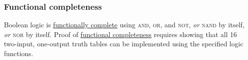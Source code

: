 \documentclass[11pt]{article}%
\begin{document}
\begin{multicols}{2}

\subsubsection{Functional completeness}
\label{Completeness}

Boolean logic is \href{https://www.geeksforgeeks.org/digital-logic-functionality-completeness/}{functionally complete} using \textsc{and}, \textsc{or}, and \textsc{not}, \textit{or} \textsc{nand} by itself, \textit{or} \textsc{nor} by itself. Proof of \href{https://en.wikipedia.org/wiki/Functional_completeness}{functional completeness} \nocite{wiki:functional-completeness} requires showing that all 16 two-input, one-output truth tables can be implemented using the specified logic functions.


\end{multicols}
\end{document}
